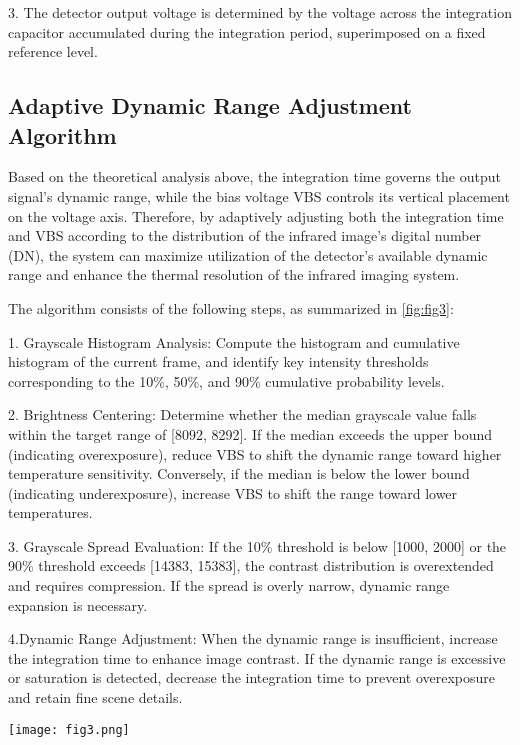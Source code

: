 \documentclass[a4paper,fleqn]{cas-dc}
\begin{document}
3. The detector output voltage is determined by the voltage across the integration capacitor accumulated during the integration period, superimposed on a fixed reference level.

\subsection{Adaptive Dynamic Range Adjustment Algorithm}
\label{subsec2}

Based on the theoretical analysis above, the integration time governs the output signal’s dynamic range, while the bias voltage VBS controls its vertical placement on the voltage axis. Therefore, by adaptively adjusting both the integration time and VBS according to the distribution of the infrared image’s digital number (DN), the system can maximize utilization of the detector’s available dynamic range and enhance the thermal resolution of the infrared imaging system.

The algorithm consists of the following steps, as summarized in \cref{fig:fig3}:

1. Grayscale Histogram Analysis: Compute the histogram and cumulative histogram of the current frame, and identify key intensity thresholds corresponding to the 10\%, 50\%, and 90\% cumulative probability levels.

2. Brightness Centering: Determine whether the median grayscale value falls within the target range of [8092, 8292]. If the median exceeds the upper bound (indicating overexposure), reduce VBS to shift the dynamic range toward higher temperature sensitivity. Conversely, if the median is below the lower bound (indicating underexposure), increase VBS to shift the range toward lower temperatures.

3. Grayscale Spread Evaluation: If the 10\% threshold is below [1000, 2000] or the 90\% threshold exceeds [14383, 15383], the contrast distribution is overextended and requires compression. If the spread is overly narrow, dynamic range expansion is necessary.

4.Dynamic Range Adjustment: When the dynamic range is insufficient, increase the integration time to enhance image contrast. If the dynamic range is excessive or saturation is detected, decrease the integration time to prevent overexposure and retain fine scene details.

 \begin{figure*}[ht]
    \centering
    \texttt{[image: fig3.png]}
    \caption{Block Diagram of the Dynamic Range Adaptive Adjustment Algorithm. Real-time histogram analysis guides VBS adjustment for voltage-axis shifting and integration time tuning for dynamic range adaptation.}
    \label{fig:fig3}
\end{figure*}
\end{document}
